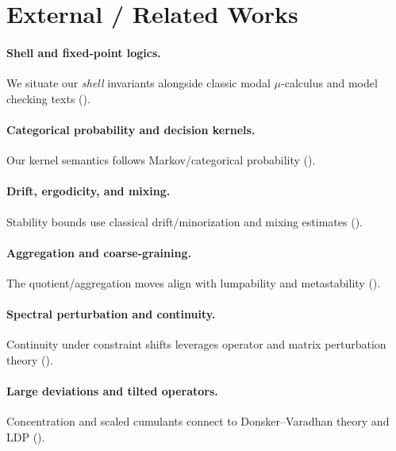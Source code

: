 \section{External / Related Works}

\paragraph{Shell and fixed-point logics.}
We situate our \emph{shell} invariants alongside classic modal $\mu$-calculus and model checking texts
(\parencite{Kozen1983,BradfieldStirling2007,BlackburnDeRijkeVenema2001,BaierKatoen2008,ClarkeGrumbergPeled1999}).

\paragraph{Categorical probability and decision kernels.}
Our kernel semantics follows Markov/categorical probability
(\parencite{Giry1982,Fritz2020,Jacobs2011,Staton2017}).

\paragraph{Drift, ergodicity, and mixing.}
Stability bounds use classical drift/minorization and mixing estimates
(\parencite{MeynTweedie2009,LevinPeresWilmer2009,Norris1998,Hajek1982}).

\paragraph{Aggregation and coarse-graining.}
The quotient/aggregation moves align with lumpability and metastability
(\parencite{KemenySnell1976,Seneta2006,DeuflhardWeber2005,LiWalshLittman2006}).

\paragraph{Spectral perturbation and continuity.}
Continuity under constraint shifts leverages operator and matrix perturbation theory
(\parencite{Kato1995,StewartSun1990}).

\paragraph{Large deviations and tilted operators.}
Concentration and scaled cumulants connect to Donsker--Varadhan theory and LDP
(\parencite{DonskerVaradhan1975,DemboZeitouni1998,Ellis1985}).

